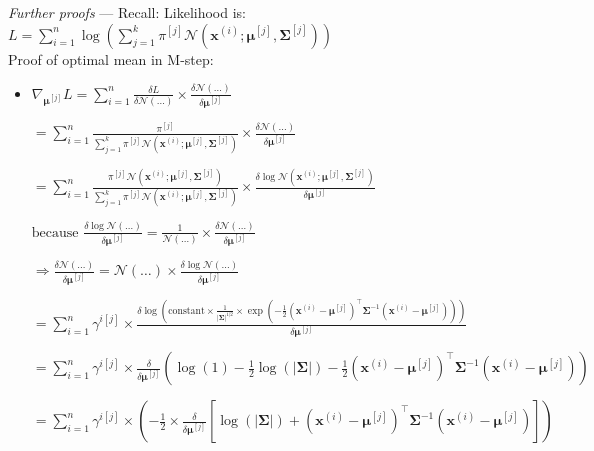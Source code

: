 \emph{Further proofs} --- 
Recall: Likelihood is:
$
L = \sum_{i=1}^n \log \left( \sum_{j=1}^k \pi^{[j]} \mathcal{N}\left( \boldsymbol{x}^{(i)}; \boldsymbol{\mu}^{[j]}, \boldsymbol{\Sigma}^{[j]} \right) \right)
$\\
Proof of optimal mean in M-step:
\begin{itemize}
    \item $ \nabla_{\boldsymbol{\mu}^{[j]}} L = \sum_{i=1}^n \frac{\delta L}{\delta \mathcal{N}(\ldots)} \times \frac{\delta \mathcal{N}(\ldots)}{\delta \boldsymbol{\mu}^{[j]}}
    $

    $
    = \sum_{i=1}^n \frac{\pi^{[j]}}{\sum_{j=1}^k \pi^{[j]} \mathcal{N}\left( \boldsymbol{x}^{(i)}; \boldsymbol{\mu}^{[j]}, \boldsymbol{\Sigma}^{[j]} \right)} \times \frac{\delta \mathcal{N}(\ldots)}{\delta \boldsymbol{\mu}^{[j]}}
    $

    $
    = \sum_{i=1}^n \frac{\pi^{[j]} \mathcal{N}\left( \boldsymbol{x}^{(i)}; \boldsymbol{\mu}^{[j]}, \boldsymbol{\Sigma}^{[j]} \right)}{\sum_{j=1}^k \pi^{[j]} \mathcal{N}\left( \boldsymbol{x}^{(i)}; \boldsymbol{\mu}^{[j]}, \boldsymbol{\Sigma}^{[j]} \right)} \times \frac{\delta \log \mathcal{N}\left( \boldsymbol{x}^{(i)}; \boldsymbol{\mu}^{[j]}, \boldsymbol{\Sigma}^{[j]} \right)}{\delta \boldsymbol{\mu}^{[j]}}
    $ 

    $
    \text{because } \frac{\delta \log \mathcal{N}(\ldots)}{\delta \boldsymbol{\mu}^{[j]}} = \frac{1}{\mathcal{N}(\ldots)} \times \frac{\delta \mathcal{N}(\ldots)}{\delta \boldsymbol{\mu}^{[j]}}
    $

    $
    \Rightarrow \frac{\delta \mathcal{N}(\ldots)}{\delta \boldsymbol{\mu}^{[j]}} = \mathcal{N}(\ldots) \times \frac{\delta \log \mathcal{N}(\ldots)}{\delta \boldsymbol{\mu}^{[j]}}
    $

    $
    = \sum_{i=1}^n \gamma^{i[j]} \times \frac{\delta \log \left(\text{constant} \times \frac{1}{|\boldsymbol{\Sigma}|^{1|2}} \times \exp\left(-\frac{1}{2} (\boldsymbol{x}^{(i)} - \boldsymbol{\mu}^{[j]})^\intercal \boldsymbol{\Sigma}^{-1} (\boldsymbol{x}^{(i)} - \boldsymbol{\mu}^{[j]}) \right)\right)}{\delta \boldsymbol{\mu}^{[j]}}
    $

    $
    = \sum_{i=1}^n \gamma^{i[j]} \times \frac{\delta}{\delta \boldsymbol{\mu}^{[j]}} \left( \log(1) - \frac{1}{2} \log(|\boldsymbol{\Sigma}|) - \frac{1}{2} (\boldsymbol{x}^{(i)} - \boldsymbol{\mu}^{[j]})^\intercal \boldsymbol{\Sigma}^{-1} (\boldsymbol{x}^{(i)} - \boldsymbol{\mu}^{[j]}) \right)
    $

    $
    = \sum_{i=1}^n \gamma^{i[j]} \times \left( -\frac{1}{2} \times \frac{\delta}{\delta \boldsymbol{\mu}^{[j]}} \left[ \log(|\boldsymbol{\Sigma}|)+ (\boldsymbol{x}^{(i)} - \boldsymbol{\mu}^{[j]})^\intercal \boldsymbol{\Sigma}^{-1} (\boldsymbol{x}^{(i)} - \boldsymbol{\mu}^{[j]}) \right] \right)
    $


\end{itemize}
